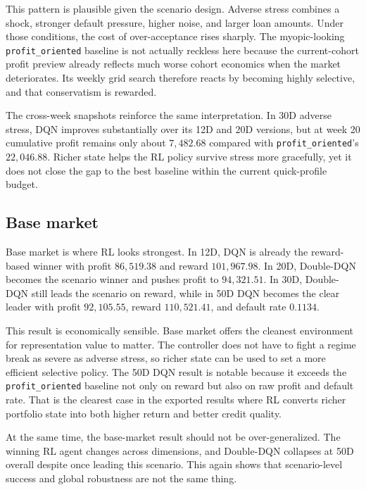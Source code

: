 \documentclass[12pt,a4paper]{article}
\begin{document}
This pattern is plausible given the scenario design. Adverse stress combines a shock, stronger default pressure, higher noise, and larger loan amounts. Under those conditions, the cost of over-acceptance rises sharply. The myopic-looking \texttt{profit\_oriented} baseline is not actually reckless here because the current-cohort profit preview already reflects much worse cohort economics when the market deteriorates. Its weekly grid search therefore reacts by becoming highly selective, and that conservatism is rewarded.

The cross-week snapshots reinforce the same interpretation. In 30D adverse stress, DQN improves substantially over its 12D and 20D versions, but at week 20 cumulative profit remains only about $7{,}482.68$ compared with \texttt{profit\_oriented}'s $22{,}046.88$. Richer state helps the RL policy survive stress more gracefully, yet it does not close the gap to the best baseline within the current quick-profile budget.

\subsection{Base market}

Base market is where RL looks strongest. In 12D, DQN is already the reward-based winner with profit $86{,}519.38$ and reward $101{,}967.98$. In 20D, Double-DQN becomes the scenario winner and pushes profit to $94{,}321.51$. In 30D, Double-DQN still leads the scenario on reward, while in 50D DQN becomes the clear leader with profit $92{,}105.55$, reward $110{,}521.41$, and default rate $0.1134$.

This result is economically sensible. Base market offers the cleanest environment for representation value to matter. The controller does not have to fight a regime break as severe as adverse stress, so richer state can be used to set a more efficient selective policy. The 50D DQN result is notable because it exceeds the \texttt{profit\_oriented} baseline not only on reward but also on raw profit and default rate. That is the clearest case in the exported results where RL converts richer portfolio state into both higher return and better credit quality.

At the same time, the base-market result should not be over-generalized. The winning RL agent changes across dimensions, and Double-DQN collapses at 50D overall despite once leading this scenario. This again shows that scenario-level success and global robustness are not the same thing.
\end{document}
